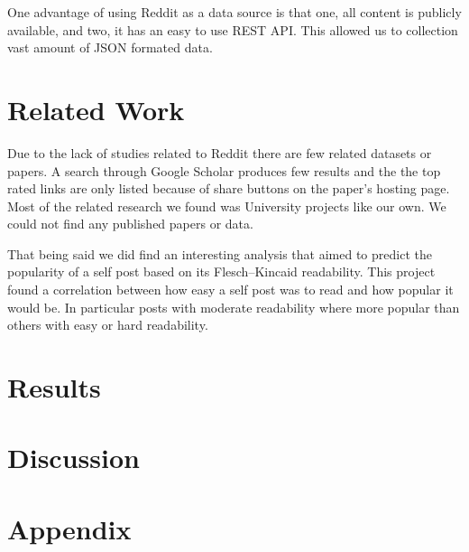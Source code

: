 \documentclass[11pt,twocolumn]{article}
\begin{document}
One advantage of using Reddit as a data source is that one, all content is publicly available, and two, it has an easy to use REST API. This allowed us to collection vast amount of JSON formated data. 

\section{Related Work}
Due to the lack of studies related to Reddit there are few related datasets or papers. A search through Google Scholar produces few results and the the top rated links are only listed because of share buttons on the paper's hosting page. Most of the related research we found was University projects like our own. We could not find any published papers or data.

That being said we did find an interesting analysis that aimed to predict the popularity of a self post based on its Flesch–Kincaid readability. This project found a correlation between how easy a self post was to read and how popular it would be. In particular posts with moderate readability where more popular than others with easy or hard readability.

\section{Results}

\section{Discussion}

\section{Appendix}
\end{document}
